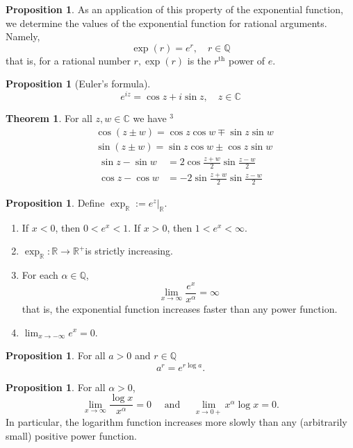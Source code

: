 \documentclass[12pt,a4paper]{book}
\newcommand{\bb}[1]{\mathbb{#1}}
\newenvironment{enu}{\begin{enumerate}[(1)]}{\end{enumerate}}
\theoremstyle{definition}
\newtheorem{theo}[defn]{Theorem}
\newtheorem{prop}[defn]{Proposition}
\begin{document}
\begin{prop}
    As an application of this property of the exponential function, we determine the values of the exponential function for rational arguments. Namely,
    $$
    \exp (r)=e^r, \quad r \in \mathbb{Q}
    $$
    that is, for a rational number $r, \exp (r)$ is the $r^{\mathrm{th}}$ power of $e$.
\end{prop}
\begin{prop}[Euler’s formula]
    $$e^{i z}=\cos z+i \sin z, \quad z \in \mathbb{C}$$
\end{prop}
\begin{theo}
    For all $z, w \in \mathbb{C}$ we have ${ }^3$
    $$
    \begin{aligned}
    & \cos (z \pm w)=\cos z \cos w \mp \sin z \sin w \\
    & \sin (z \pm w)=\sin z \cos w \pm \cos z \sin w
    \end{aligned}
    $$
    $$
    \begin{aligned}
    \sin z-\sin w & =2 \cos \frac{z+w}{2} \sin \frac{z-w}{2} \\
    \cos z-\cos w & =-2 \sin \frac{z+w}{2} \sin \frac{z-w}{2}
    \end{aligned}
    $$    
\end{theo}
\begin{prop}
    Define $\exp _{\mathbb{R}}:=\left.e^z\right|_{\bb{R}}$. 
\begin{enu}
    \item If $x<0$, then $0<e^x<1$. If $x>0$, then $1<e^x<\infty$.
    \item $\exp _{\mathbb{R}}: \mathbb{R} \rightarrow \mathbb{R}^{+}$is strictly increasing.
    \item For each $\alpha \in \mathbb{Q}$,
    $$
    \lim _{x \rightarrow \infty} \frac{e^x}{x^\alpha}=\infty
    $$
    that is, the exponential function increases faster than any power function.
    \item $\lim _{x \rightarrow-\infty} e^x=0$.
\end{enu}
\end{prop}
\begin{prop}
    For all $a>0$ and $r \in \mathbb{Q}$
    $$
    a^r=e^{r \log a} .
    $$
\end{prop}
\begin{prop}
    For all $\alpha>0$,
    $$
    \lim _{x \rightarrow \infty} \frac{\log x}{x^\alpha}=0 \quad \text { and } \quad \lim _{x \rightarrow 0+} x^\alpha \log x=0 .
    $$
    In particular, the logarithm function increases more slowly than any (arbitrarily small) positive power function.
\end{prop}
\end{document}
